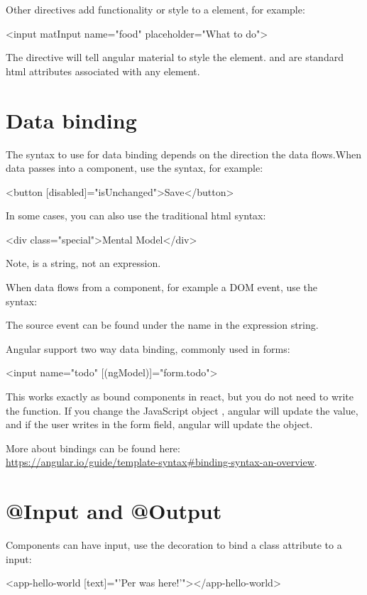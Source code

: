 \begin{itemize}
Other directives add functionality or style to a element, for example:
\begin{Code}
<input matInput name="food" placeholder="What to do">
\end{Code}
The  directive will tell angular material to style the  element.  and  are standard html attributes associated with any  element. 

\section{Data binding}
The syntax to use for data binding depends on the direction the data flows.When data passes into a component, use the  syntax, for example:
\begin{Code}
<button [disabled]="isUnchanged">Save</button>
\end{Code}
In some cases, you can also use the traditional html syntax:
\begin{Code}
<div class="special">Mental Model</div>
\end{Code}
Note,  is a string, not an expression. 

When data flows from a component, for example a DOM event, use the\\  syntax:
The source event can be found under the name  in the expression string.

Angular support two way data binding, commonly used in forms:
\begin{Code}
<input name="todo" [(ngModel)]="form.todo">
\end{Code}
This works exactly as bound components in react, but you do not need to write the  function. If you change the JavaScript object , angular will update the  value, and if the user writes in the form field, angular will update the  object.

More about bindings can be found here:\\ \url{https://angular.io/guide/template-syntax#binding-syntax-an-overview}.
\section{@Input and @Output}
Components can have input, use the  decoration to bind a class attribute to a input:
\begin{Code}
@Component({
  selector: 'app-hello-world',
  template: `
    <h3>Hello World</h3>
    <p> {{text}}
  `
})
export class HeroChildComponent {
  @Input() text: string;
\end{Code}
\begin{Code}
<app-hello-world [text]="'Per was here!'"></app-hello-world>
\end{Code}


\end{itemize}

